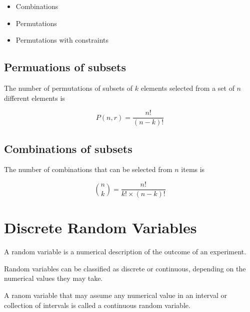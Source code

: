 \begin{itemize}
\item Combinations
\item Permutations
\item Permutations with constraints
\end{itemize}



\subsection{Permuations of subsets}

The number of permutations of subsets of $k$ elements selected from a set of $n$ different elements is

\[P(n,r) = \frac{n!}{(n-k)!}  \]


\subsection{Combinations of subsets}

The number of combinations that can be selected from $n$ items is

\[ {n \choose k} = \frac{n!}{k! \times (n-k)!}  \]
\newpage
\section{Discrete Random Variables}

A random variable is a numerical description of the outcome of an experiment.

Random variables can be classified as discrete or continuous, depending on the numerical values they may take.

A ranom variable that may assume any numerical value in an interval or collection of intervals is called a continuous random variable.




